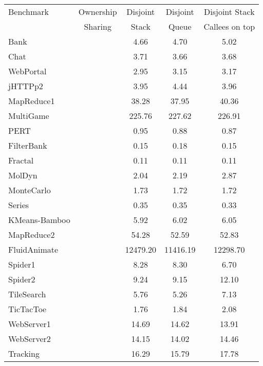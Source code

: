 \documentclass{amsart}[9pt]
\begin{document}
\begin{tabular}{|l|c|c|c|c|}
\hline
Benchmark     & Ownership & Disjoint & Disjoint & Disjoint Stack \\
              & Sharing   & Stack    & Queue    & Callees on top \\
\hline
Bank          &  & 4.66     & 4.70     &  5.02           \\
Chat          &  & 3.71     & 3.66     &  3.68           \\
WebPortal     &  & 2.95     & 3.15     &  3.17           \\
jHTTPp2       &  & 3.95     & 4.44     &  3.96           \\
MapReduce1    &  & 38.28    & 37.95    &  40.36          \\
MultiGame     &  & 225.76   & 227.62   &  226.91         \\
PERT          &  & 0.95     & 0.88     &  0.87           \\
FilterBank    &  & 0.15     & 0.18     &  0.15           \\
Fractal       &  & 0.11     & 0.11     &  0.11           \\
MolDyn        &  & 2.04     & 2.19     &  2.87           \\
MonteCarlo    &  & 1.73     & 1.72     &  1.72           \\
Series        &  & 0.35     & 0.35     &  0.33           \\
KMeans-Bamboo &  & 5.92     & 6.02     &  6.05           \\
MapReduce2    &  & 54.28    & 52.59    &  52.83          \\
FluidAnimate  &  & 12479.20 & 11416.19 &  12298.70       \\
Spider1       &  & 8.28     & 8.30     &  6.70           \\
Spider2       &  & 9.24     & 9.15     &  12.10          \\
TileSearch    &  & 5.76     & 5.26     &  7.13           \\
TicTacToe     &  & 1.76     & 1.84     &  2.08           \\
WebServer1    &  & 14.69    & 14.62    &  13.91          \\
WebServer2    &  & 14.15    & 14.02    &  14.46          \\
Tracking      &  & 16.29    & 15.79    &  17.78          \\
\hline
\end{tabular}
\end{document}
